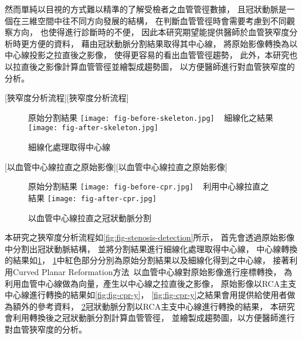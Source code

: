 \documentclass[class=NCU_thesis, crop=false]{standalone}
\begin{document}
然而單純以目視的方式難以精準的了解受檢者之血管管徑數據，
且冠狀動脈是一個在三維空間中往不同方向發展的結構，
在判斷血管管徑時會需要考慮到不同觀察方向，
也使得進行診斷時的不便，
因此本研究期望能提供醫師於血管狹窄度分析時更方便的資料，
藉由冠狀動脈分割結果取得其中心線，
將原始影像轉換為以中心線投影之拉直後之影像，
使得更容易的看出血管管徑趨勢，
此外，本研究也以拉直後之影像計算血管管徑並繪製成趨勢圖，
以方便醫師進行對血管狹窄度的分析。

[狹窄度分析流程][狹窄度分析流程]

\begin{figure}[!hbt]
    \centering
    \subcaptionbox
        {原始分割結果
        \label{fig:fig-before-skeleton}}
        {\texttt{[image: fig-before-skeleton.jpg]}}
    ~
    \subcaptionbox
        {細線化之結果
        \label{fig:fig-after-skeleton}}
        {\texttt{[image: fig-after-skeleton.jpg]}}
    \caption{細線化處理取得中心線}
    \label{fig:fig-skeleton}
\end{figure}

[以血管中心線拉直之原始影像][以血管中心線拉直之原始影像]

\begin{figure}[!hbt]
    \centering
    \subcaptionbox
        {原始分割結果
        \label{fig:fig-before-cpr}}
        {\texttt{[image: fig-before-cpr.jpg]}}
    ~
    \subcaptionbox
        {利用中心線拉直之結果
        \label{fig:fig-after-cpr}}
        {\texttt{[image: fig-after-cpr.jpg]}}
    \caption{以血管中心線拉直之冠狀動脈分割}
    \label{fig:fig-cpr}
\end{figure}

本研究之狹窄度分析流程如\cref{fig:fig-stenosis-detection}所示，
首先會透過原始影像中分割出冠狀動脈結構，
並將分割結果進行細線化處理取得中心線，
中心線轉換的結果如\cref{fig:fig-skeleton}，
\cref{fig:fig-skeleton}中紅色部分分別為原始分割結果以及細線化得到之中心線，
接著利用Curved Planar Reformation方法~\cite{kanitsarCPRCurvedPlanar2002}以血管中心線對原始影像進行座標轉換，
為利用血管中心線做為向量，產生以中心線之拉直後之影像，
原始影像以RCA主支中心線進行轉換的結果如\cref{fig:fig-cpr-y}，
\cref{fig:fig-cpr-y}之結果會用提供給使用者做為額外的參考資料，
\cref{fig:fig-cpr}冠狀動脈分割以RCA主支中心線進行轉換的結果，
本研究會利用轉換後之冠狀動脈分割計算血管管徑，
並繪製成趨勢圖，以方便醫師進行對血管狹窄度的分析。
\end{document}

